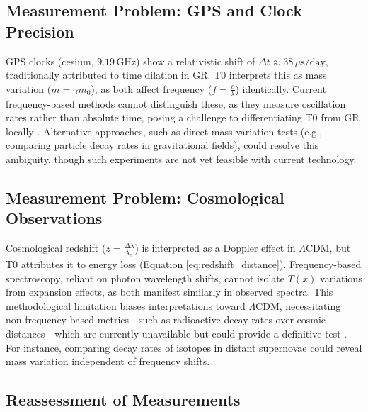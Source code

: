 \documentclass[12pt,a4paper]{article}
\newcommand{\Tfield}{T(x)}
\begin{document}
	\subsection{Measurement Problem: GPS and Clock Precision}
	\label{subsec:gps_clock_problem}
	
	GPS clocks (cesium, \(9.19 \, \text{GHz}\)) show a relativistic shift of \(\Delta t \approx 38 \, \mu\text{s/day}\), traditionally attributed to time dilation in GR. T0 interprets this as mass variation (\(m = \gamma m_0\)), as both affect frequency (\(f = \frac{c}{\lambda}\)) identically. Current frequency-based methods cannot distinguish these, as they measure oscillation rates rather than absolute time, posing a challenge to differentiating T0 from GR locally \cite{pascher_quantum_2025}. Alternative approaches, such as direct mass variation tests (e.g., comparing particle decay rates in gravitational fields), could resolve this ambiguity, though such experiments are not yet feasible with current technology.
	
	\subsection{Measurement Problem: Cosmological Observations}
	\label{subsec:cosmological_measurement_problem}
	
	Cosmological redshift (\(z = \frac{\Delta \lambda}{\lambda_0}\)) is interpreted as a Doppler effect in \(\Lambda\)CDM, but T0 attributes it to energy loss (Equation \ref{eq:redshift_distance}). Frequency-based spectroscopy, reliant on photon wavelength shifts, cannot isolate \(\Tfield\) variations from expansion effects, as both manifest similarly in observed spectra. This methodological limitation biases interpretations toward \(\Lambda\)CDM, necessitating non-frequency-based metrics—such as radioactive decay rates over cosmic distances—which are currently unavailable but could provide a definitive test \cite{pascher_alphabeta_2025}. For instance, comparing decay rates of isotopes in distant supernovae could reveal mass variation independent of frequency shifts.
	
	\subsection{Reassessment of Measurements}
	\label{subsec:reassessment_measurements}
	
\end{document}
